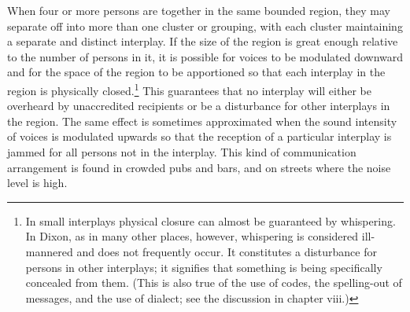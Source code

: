 \documentclass[twoside,symmetric,nobib,justified]{tufte-book}
\begin{document}
When four or more persons are together in the same bounded region, they
may separate off into more than one cluster or grouping, with each
cluster maintaining a separate and distinct interplay. If the size of
the region is great enough relative to the number of persons in it, it
is possible for voices to be modulated downward and for the space of the
region to be apportioned so that each interplay in the region is
physically closed.\footnote{In small interplays physical closure can
  almost be guaranteed by whispering. In Dixon, as in many other places,
  however, whispering is considered ill-mannered and does not frequently
  occur. It constitutes a disturbance for persons in other interplays;
  it signifies that something is being specifically concealed from them.
  (This is also true of the use of codes, the spelling-out of messages,
  and the use of dialect; see the discussion in chapter viii.)} This
guarantees that no interplay will either be overheard by unaccredited
recipients or be a disturbance for other interplays in the region. The
same effect is sometimes approximated when the sound intensity of voices
is modulated upwards so that the reception of a particular interplay is
jammed for all persons not in the interplay. This kind of communication
arrangement is found in crowded pubs and bars, and on streets where the
noise level is high.
\end{document}
